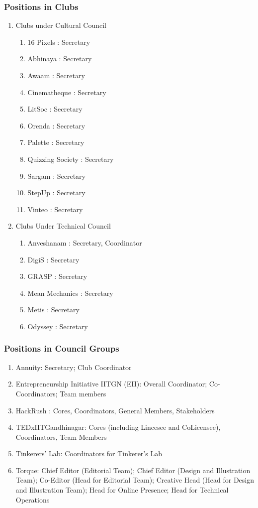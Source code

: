 \documentclass[12pt]{article}
\begin{document}
\subsubsection{Positions in Clubs}
\begin{enumerate}
    \item Clubs under Cultural Council
    \begin{enumerate}
        \item 16 Pixels : Secretary
        \item Abhinaya : Secretary
        \item Awaam : Secretary
        \item Cinematheque : Secretary
        \item LitSoc : Secretary
        \item Orenda : Secretary
        \item Palette : Secretary
        \item Quizzing Society : Secretary
        \item Sargam : Secretary
        \item StepUp : Secretary
        \item Vinteo : Secretary
    \end{enumerate}
    \item Clubs Under Technical Council
    \begin{enumerate}
        \item Anveshanam : Secretary, Coordinator
        \item DigiS : Secretary
        \item GRASP : Secretary
        \item Mean Mechanics : Secretary
        \item Metis : Secretary
        \item Odyssey : Secretary
    \end{enumerate}
\end{enumerate}


\subsubsection{Positions in Council Groups}
\begin{enumerate}
    \item Annuity: Secretary; Club Coordinator
    \item Entrepreneurship Initiative IITGN (EII): Overall Coordinator; Co-Coordinators; Team members
    \item HackRush : Cores, Coordinators, General Members, Stakeholders
    \item TEDxIITGandhinagar: Cores (including Lincesee and CoLicensee), Coordinators, Team Members
    \item Tinkerers' Lab: Coordinators for Tinkerer's Lab
    \item Torque: Chief Editor (Editorial Team); Chief Editor (Design and Illustration Team); Co-Editor (Head for Editorial Team); Creative Head (Head for Design and Illustration Team); Head for Online Presence; Head for Technical Operations
\end{enumerate}
\end{document}

